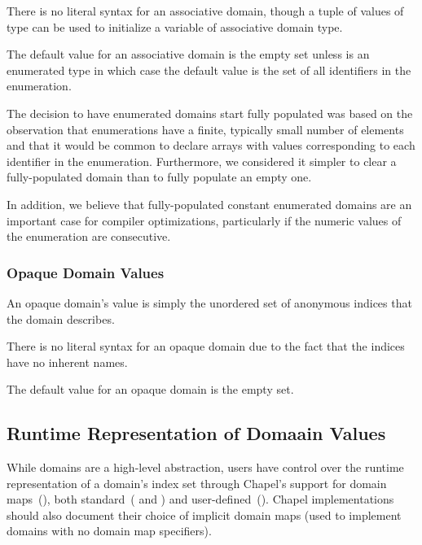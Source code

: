 There is no literal syntax for an associative domain, though a tuple
of values of type  can be used to initialize a variable
of associative domain type.


The default value for an associative domain is the empty set unless
 is an enumerated type in which case the default value
is the set of all identifiers in the enumeration.

\begin{rationale}

The decision to have enumerated domains start fully populated was
based on the observation that enumerations have a finite, typically
small number of elements and that it would be common to declare arrays
with values corresponding to each identifier in the enumeration.
Furthermore, we considered it simpler to clear a fully-populated
domain than to fully populate an empty one.

In addition, we believe that fully-populated constant enumerated
domains are an important case for compiler optimizations, particularly
if the numeric values of the enumeration are consecutive.

\end{rationale}


\subsubsection{Opaque Domain Values}

An opaque domain's value is simply the unordered set of anonymous
indices that the domain describes.

There is no literal syntax for an opaque domain due to the fact that
the indices have no inherent names.

The default value for an opaque domain is the empty set.


\subsection{Runtime Representation of Domaain Values}

While domains are a high-level abstraction, users have control over
the runtime representation of a domain's index set through Chapel's
support for domain maps~(), both
standard~( and )
and user-defined~().  Chapel
implementations should also document their choice of implicit domain
maps (used to implement domains with no domain map specifiers).

